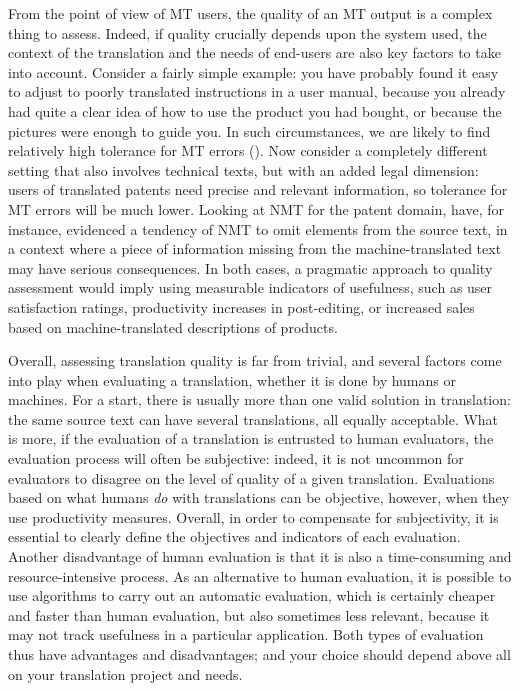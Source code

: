 \documentclass[output=paper]{langscibook}
\begin{document}
From the point of view of MT users, the {quality} of an MT output is a complex thing to assess. Indeed, if {quality crucially} {depends} upon the {system} {used}, the {context} of the translation and the {needs} of end-users are also key {factors} to take into {account}. {Consider} a fairly {simple} {example}: you have probably found it easy to adjust to poorly translated instructions in a user manual, because you already had quite a {clear} idea of how to {use} the {product} you had bought, or because the pictures were enough to guide you. In such {circumstances}, we are {likely} to find relatively {high} tolerance for MT {errors} (\citealt{CastilhoOBrien2016}). Now consider a completely {different} setting that also involves technical texts, but with an added legal dimension: users of translated patents {need} {precise} and relevant {information}, so tolerance for MT {errors} will be much lower. Looking at NMT for the patent domain, \citet[113]{CastilhoWay2017} have, for instance, evidenced a tendency of NMT to omit elements from the source text, in a context where a piece of information missing from the machine-translated text may have serious consequences. In both cases, a pragmatic approach to quality assessment would imply using measurable indicators of usefulness, such as user satisfaction ratings, productivity increases in post-editing, or increased sales based on machine-translated descriptions of products.

Overall, assessing translation quality is far from trivial, and several factors come into play when evaluating a translation, whether it is done by humans or machines. For a start, there is usually more than one valid solution in translation: the same source text can have several translations, all equally acceptable. What is more, if the evaluation of a translation is entrusted to human evaluators, the evaluation process will often be subjective: indeed, it is not uncommon for evaluators to disagree on the level of quality of a given translation. Evaluations based on what humans \textit{do} with translations can be objective, however, when they use productivity measures. Overall, in order to compensate for subjectivity, it is essential to clearly define the objectives and indicators of each evaluation. Another disadvantage of human evaluation is that it is also a time-consuming and resource-intensive process. As an alternative to human evaluation, it is possible to use algorithms to carry out an automatic evaluation, which is certainly cheaper and faster than human evaluation, but also sometimes less relevant, because it may not track usefulness in a particular application. Both types of evaluation thus have advantages and disadvantages; and your choice should depend above all on your translation project and needs.
\end{document}
